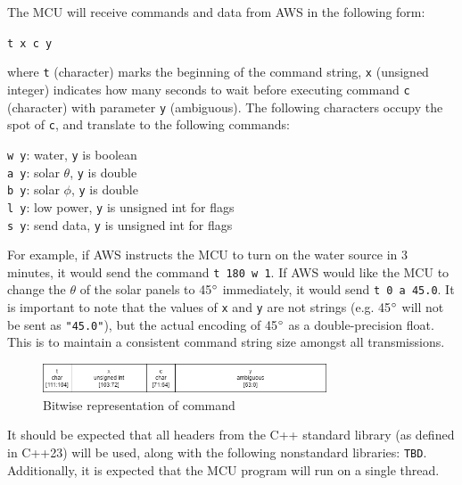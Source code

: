 \begin{flushleft}
    The MCU will receive commands and data from AWS in the following form:
    \begin{center}
        \texttt{t x c y}
    \end{center}
    where \texttt{t} (character) marks the beginning of the command string,
    \texttt{x} (unsigned integer) indicates how many seconds to wait before
    executing command \texttt{c} (character) with parameter \texttt{y}
    (ambiguous). The following characters occupy the spot of \texttt{c}, and
    translate to the following commands:
    \begin{center}
        \texttt{w y}: water, \texttt{y} is boolean \\
        \texttt{a y}: solar $\theta$, \texttt{y} is double \\
        \texttt{b y}: solar $\phi$, \texttt{y} is double \\
        \texttt{l y}: low power, \texttt{y} is unsigned int for flags \\
        \texttt{s y}: send data, \texttt{y} is unsigned int for flags
    \end{center}
    For example, if AWS instructs the MCU to turn on the water source in 3
    minutes, it would send the command \texttt{t 180 w 1}. If AWS would like
    the MCU to change the $\theta$ of the solar panels to 45$\degree$
    immediately, it would send \texttt{t 0 a 45.0}. It is important to note
    that the values of \texttt{x} and \texttt{y} are not strings (e.g.
    45$\degree$ will not be sent as \texttt{"45.0"}), but the actual encoding
    of 45$\degree$ as a double-precision float. This is to maintain a
    consistent command string size amongst all transmissions.
    \begin{figure}[H]
        \label{command_bitwise}
        \caption{Bitwise representation of command}
        \centering
        \includegraphics[width=0.75\textwidth]{images/command_encoding.png}
    \end{figure}
\end{flushleft}
\begin{flushleft}
    It should be expected that all headers from the C++ standard library (as
    defined in C++23) will be used, along with the following nonstandard
    libraries: \texttt{TBD}. Additionally, it is expected that the MCU program
    will run on a single thread.
\end{flushleft}
